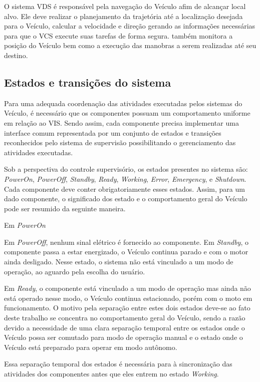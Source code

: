 \documentclass[conference]{IEEEtran}
\begin{document}
O sistema VDS é responsável pela navegação do Veículo afim de alcançar local alvo. Ele deve realizar o planejamento da trajetória até a localização desejada para o Veículo, calcular a velocidade e direção gerando as informações necessárias para que o VCS execute suas tarefas de forma segura. também
monitora a posição do Veículo bem como a execução das manobras a serem realizadas até seu destino.

\subsection{Estados e transições do sistema}\label{subsec:states_transitions}

Para uma adequada coordenação das atividades executadas pelos sistemas do Veículo, é necessário que os componentes possuam um comportamento uniforme em relação ao VIS. Sendo assim, cada componente precisa implementar uma interface comum representada por um conjunto de estados e transições reconhecidos pelo sistema de supervisão possibilitando o gerenciamento das atividades executadas.

Sob a perspectiva do controle supervisório, os estados presentes no sistema são: \textit{PowerOn}, \textit{PowerOff}, \textit{Standby}, \textit{Ready}, \textit{Working}, \textit{Error}, \textit{Emergency}, e \textit{Shutdown}. Cada componente deve conter obrigatoriamente esses estados. Assim, para um dado componente, o significado dos estado e o comportamento geral do Veículo pode ser resumido da seguinte maneira.

Em \textit{PowerOn}

Em \textit{PowerOff}, nenhum sinal elétrico é fornecido ao componente. Em \textit{Standby}, o componente passa a estar energizado, o Veículo continua parado e com o motor ainda desligado. Nesse estado, o sistema não está vinculado a um modo de operação, ao aguardo pela escolha do usuário.

Em \textit{Ready}, o componente está vinculado a um modo de operação mas ainda não está operado nesse modo, o Veículo continua estacionado, porém com o moto em funcionamento. O motivo pela separação entre estes dois estados deve-se ao fato deste trabalho se concentra no comportamento geral do Veículo, sendo a razão devido a necessidade de uma clara separação temporal entre os estados onde o Veículo possa ser comutado para modo de operação manual e o estado onde o Veículo está preparado para operar em modo autônomo. 

Essa separação temporal dos estados é necessária para à sincronização das atividades dos componentes antes que eles entrem no estado \textit{Working}.
\end{document}
